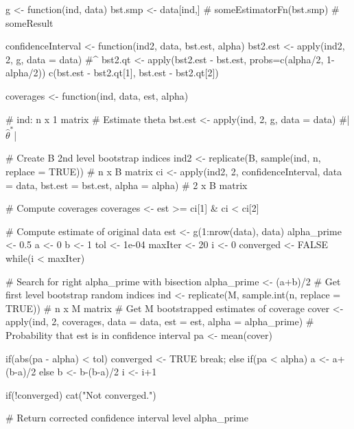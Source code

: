  \begin{code}
  g <- function(ind, data){
    bst.smp <- data[ind,]
    # someEstimatorFn(bst.smp)
    # someResult
  }
 
  confidenceInterval <- function(ind2, data, bst.est, alpha){
    bst2.est <- apply(ind2, 2, g, data = data) #\hat{\theta}^{\ast\ast}
    bst2.qt <- apply(bst2.est - bst.est, probs=c(alpha/2, 1-alpha/2))
    c(bst.est - bst2.qt[1], bst.est - bst2.qt[2])
  }
 
  coverages <- function(ind, data, est, alpha){ # ind: n x 1 matrix
    # Estimate theta
    bst.est <- apply(ind, 2, g, data = data) #|$\hat{\theta}^{\ast}$|
    
    # Create B 2nd level bootstrap indices
    ind2 <- replicate(B, sample(ind, n, replace = TRUE)) # n x B matrix
    ci <- apply(ind2, 2, confidenceInterval, data = data, bst.est = bst.est, alpha = alpha) # 2 x B matrix
    
    # Compute coverages
    coverages <- est >= ci[1] & ci < ci[2]
  }
 
  # Compute estimate of original data
  est <- g(1:nrow(data), data)
  alpha_prime <- 0.5
  a <- 0
  b <- 1
  tol <- 1e-04
  maxIter <- 20
  i <- 0
  converged <- FALSE
  while(i < maxIter){ # Search for right alpha_prime with bisection
    alpha_prime <- (a+b)/2
    # Get first level bootstrap random indices
    ind <- replicate(M, sample.int(n, replace = TRUE)) # n x M matrix
    # Get M bootstrapped estimates of coverage
    cover <- apply(ind, 2, coverages, data = data, est = est, alpha = alpha_prime)
    # Probability that est is in confidence interval
    pa <- mean(cover)
    
    if(abs(pa - alpha) < tol){
        converged <- TRUE
        break;
    }
    else{
        if(pa < alpha){
            a <- a+(b-a)/2
        }
        else{
            b <- b-(b-a)/2
        }
    }
    i <- i+1
  }
  
  if(!converged){
    cat("Not converged.")
  }
  
  # Return corrected confidence interval level
  alpha_prime
 \end{code}

